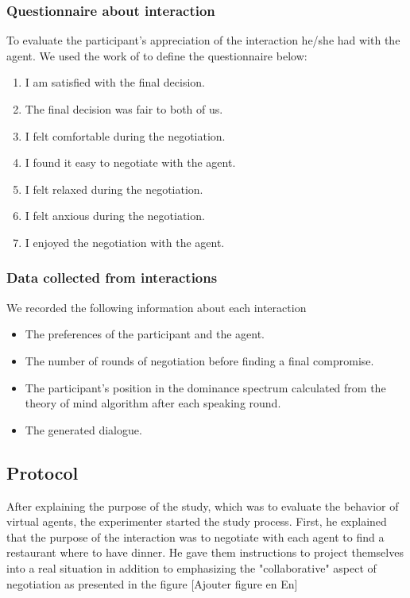 \documentclass[10pt, a4paper]{article} %
\begin{document}
					
		\subsubsection{Questionnaire about interaction}
		To evaluate the participant's appreciation of the interaction he/she had with the agent. We used the work of \cite{tiedens2003power,wiltermuth2009benefits,olekalns2013dyadic} to define the questionnaire below:
		
		\begin{enumerate}
		\item I am satisfied with the final decision.
		\item The final decision was fair to both of us.
		\item I felt comfortable during the negotiation.
		\item I found it easy to negotiate with the agent.
		\item I felt relaxed during the negotiation.
		\item I felt anxious during the negotiation.
		\item I enjoyed the negotiation with the agent.
	\end{enumerate}
	
	
	\subsubsection{Data collected from interactions}
	We recorded the following information about each interaction
	\begin{itemize}
		\item The preferences of the participant and the agent.
		\item The number of rounds of negotiation before finding a final compromise.
		\item The participant's position in the dominance spectrum calculated from the theory of mind algorithm after each speaking round.
		\item The generated dialogue.
		
	\end{itemize}
		
		
		\subsection{Protocol}
		\label{sec:proto}
		After explaining the purpose of the study, which was to evaluate the behavior of virtual agents, the experimenter started the study process. 
		First, he explained that the purpose of the interaction was to negotiate with each agent to find a restaurant where to have dinner. He gave them instructions to project themselves into a real situation in addition to emphasizing the "collaborative" aspect of negotiation as presented in the figure %
		[Ajouter figure en En]
		
\end{document}
